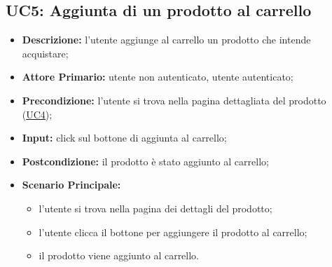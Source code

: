 \subsection{UC5: Aggiunta di un prodotto al carrello}
\label{sec:UC5}
\begin{itemize}
    \item \textbf{Descrizione:} l'utente aggiunge al carrello un prodotto che intende acquistare;
    \item \textbf{Attore Primario:} utente non autenticato, utente autenticato;
    \item \textbf{Precondizione:} l'utente si trova nella pagina dettagliata del prodotto (\hyperref[sec:UC4]{\underline{UC4}});
    \item \textbf{Input:} click sul bottone di aggiunta al carrello;
    \item \textbf{Postcondizione:} il prodotto è stato aggiunto al carrello;
    \item \textbf{Scenario Principale:}
          \begin{itemize}
              \item l'utente si trova nella pagina dei dettagli del prodotto;
              \item l'utente clicca il bottone per aggiungere il prodotto al carrello;
              \item il prodotto viene aggiunto al carrello.
          \end{itemize}
\end{itemize}